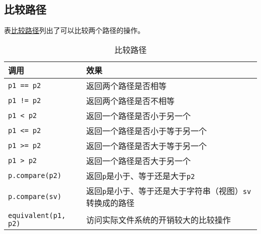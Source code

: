 \subsection{比较路径}\label{ch20.3.6}
表\hyperref[t20.8]{比较路径}列出了可以比较两个路径的操作。
\begin{table}[ht]
    \centering
    \begin{tabular}{l|l}
        \hline
        \textbf{调用}                 & \textbf{效果}                                    \\
        \hline
        \texttt{p1 == p2}           & 返回两个路径是否相等                                     \\
        \texttt{p1 != p2}           & 返回两个路径是否不相等                                    \\
        \texttt{p1 < p2}            & 返回一个路径是否小于另一个                                  \\
        \texttt{p1 <= p2}           & 返回一个路径是否小于等于另一个                                \\
        \texttt{p1 >= p2}           & 返回一个路径是否大于等于另一个                                \\
        \texttt{p1 > p2}            & 返回一个路径是否大于另一个                                  \\
        \texttt{p.compare(p2)}      & 返回\texttt{p}是小于、等于还是大于\texttt{p2}              \\
        \texttt{p.compare(sv)}      & 返回\texttt{p}是小于、等于还是大于字符串（视图）\texttt{sv}转换成的路径 \\
        \texttt{equivalent(p1, p2)} & 访问实际文件系统的开销较大的比较操作                             \\
        \hline
    \end{tabular}
    \caption{比较路径}
    \label{t20.8}
\end{table}

